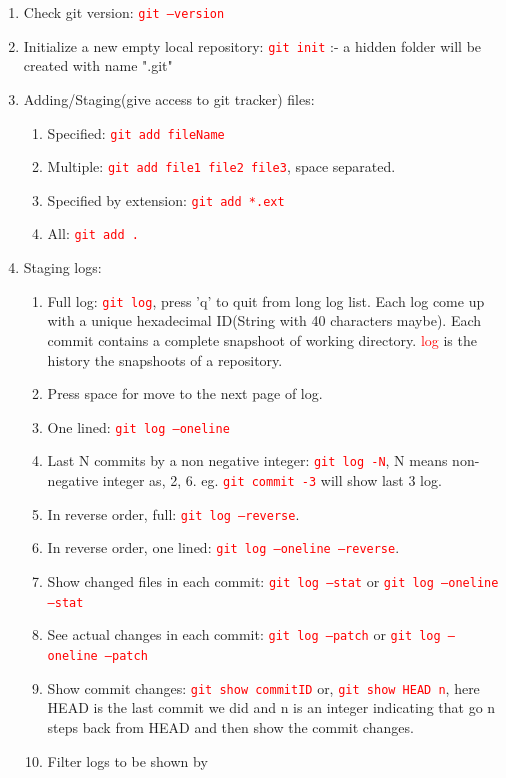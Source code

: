 \documentclass[12 pt, letterpaper]{extarticle}
\newcommand{\R}{\textcolor{red}} %
\newcommand{\T}{\texttt}
\begin{document}
\begin{enumerate}
	\item Check git version: \R{\T{git --version}}
	\item Initialize a new empty local repository: \R{\T{git init}} :- a hidden folder will be created with name ".git"

	\item Adding/Staging(give access to git tracker) files:
	      \begin{enumerate}
		      \item Specified: \R{\T{git add fileName}}
		      \item Multiple: \R{\T{git add file1 file2 file3}}, space separated.
		      \item Specified by extension: \R{\T{git add *.ext}}
		      \item All: \R{\T{git add .}}
	      \end{enumerate}
	\item Staging logs:
	      \begin{enumerate}
		      \item Full log: \R{\T{git log}}, press 'q' to quit from long log list. Each log come up with a unique hexadecimal ID(String with 40 characters maybe). Each commit contains a complete snapshoot of working directory. \R{log} is the history the snapshoots of a repository.
		      \item Press space for move to the next page of log.
		      \item One lined: \R{\T{git log --oneline}}
		      \item Last N commits by a non negative integer: \R{\T{git log -N}}, N means non-negative integer as, 2, 6. eg. \R{\T{git commit -3}} will show last 3 log.
		      \item In reverse order, full: \R{\T{git log --reverse}}.
		      \item In reverse order, one lined: \R{\T{git log --oneline --reverse}}.
		      \item Show changed files in each commit: \R{\T{git log --stat}} or \R{\T{git log --oneline --stat}}
		      \item See actual changes in each commit: \R{\T{git log --patch}} or \R{\T{git log --oneline --patch}}
		      \item Show commit changes: \R{\T{git show commitID}} or, \R{\T{git show HEAD~n}}, here HEAD is the last commit we did and n is an integer indicating that go n steps back from HEAD and then show the commit changes.
		      \item Filter logs to be shown by

\end{enumerate}
\end{enumerate}
\end{document}
